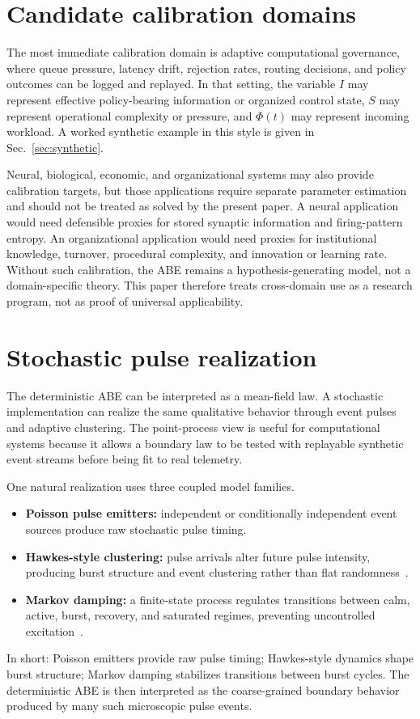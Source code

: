 \documentclass[11pt]{article}
\begin{document}
\section{Candidate calibration domains}
The most immediate calibration domain is adaptive computational governance, where queue pressure, latency drift, rejection rates, routing decisions, and policy outcomes can be logged and replayed. In that setting, the variable $I$ may represent effective policy-bearing information or organized control state, $S$ may represent operational complexity or pressure, and $\Phi(t)$ may represent incoming workload. A worked synthetic example in this style is given in Sec.~\ref{sec:synthetic}.

Neural, biological, economic, and organizational systems may also provide calibration targets, but those applications require separate parameter estimation and should not be treated as solved by the present paper. A neural application would need defensible proxies for stored synaptic information
\clearpage
\noindent and firing-pattern entropy. An organizational application would need proxies for institutional knowledge, turnover, procedural complexity, and innovation or learning rate. Without such calibration, the ABE remains a hypothesis-generating model, not a domain-specific theory. This paper therefore treats cross-domain use as a research program, not as proof of universal applicability.

\section{Stochastic pulse realization}
The deterministic ABE can be interpreted as a mean-field law. A stochastic implementation can realize the same qualitative behavior through event pulses and adaptive clustering. The point-process view is useful for computational systems because it allows a boundary law to be tested with replayable synthetic event streams before being fit to real telemetry.

One natural realization uses three coupled model families.
\begin{itemize}
  \item \textbf{Poisson pulse emitters:} independent or conditionally independent event sources produce raw stochastic pulse timing.
  \item \textbf{Hawkes-style clustering:} pulse arrivals alter future pulse intensity, producing burst structure and event clustering rather than flat randomness~\cite{hawkes1971spectra}.
  \item \textbf{Markov damping:} a finite-state process regulates transitions between calm, active, burst, recovery, and saturated regimes, preventing uncontrolled excitation~\cite{norris1997markov,gardiner2009stochastic}.
\end{itemize}
In short: Poisson emitters provide raw pulse timing; Hawkes-style dynamics shape burst structure; Markov damping stabilizes transitions between burst cycles. The deterministic ABE is then interpreted as the coarse-grained boundary behavior produced by many such microscopic pulse events.
\end{document}

